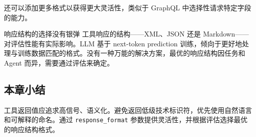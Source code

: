 还可以添加更多格式以获得更大灵活性，类似于 GraphQL 中选择性请求特定字段的能力。

\begin{warningbox}{响应结构的选择没有银弹}
工具响应的结构——XML、JSON 还是 Markdown——对评估性能有实际影响。LLM 基于 next-token prediction 训练，倾向于更好地处理与训练数据匹配的格式。没有一种万能的解决方案，最优的响应结构因任务和 Agent 而异，需要通过评估来确定。
\end{warningbox}

\subsection{本章小结}

工具返回值应追求高信号、语义化。避免返回低级技术标识符，优先使用自然语言和可解释的命名。通过 \texttt{response\_format} 参数提供灵活性，并根据评估选择最优的响应结构格式。


